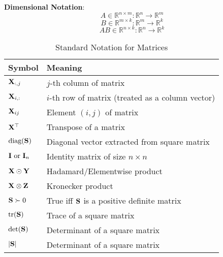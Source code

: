 \textbf{Dimensional Notation}:
\begin{equation}
    A \in \mathbb{R}^{n \times m} : \mathbb{R}^n \to \mathbb{R}^m
\end{equation}
\begin{equation}
    B \in \mathbb{R}^{m \times k} : \mathbb{R}^m \to \mathbb{R}^k
\end{equation}
\begin{equation}
    AB \in \mathbb{R}^{n \times k} : \mathbb{R}^n \to \mathbb{R}^k
\end{equation}






\begin{table}[h!]
    \centering
    \begin{tabularx}{\textwidth}{@{}p{} X@{}}
        \toprule
        \textbf{Symbol}               & \textbf{Meaning}                                  \\ \midrule
        $\mathbf{X}_{:,j}$                & $j$-th column of matrix                           \\
        $\mathbf{X}_{i,:}$                & $i$-th row of matrix (treated as a column vector) \\
        $\mathbf{X}_{ij}$                 & Element $(i, j)$ of matrix                        \\
        $\mathbf{X}^\top$                 & Transpose of a matrix                             \\
        $\text{diag}(\mathbf{S})$         & Diagonal vector extracted from square matrix      \\
        $\mathbf{I} \text{ or } \mathbf{I}_n$ & Identity matrix of size $n \times n$              \\
        $\mathbf{X} \odot \mathbf{Y}$         & Hadamard/Elementwise product                      \\
        $\mathbf{X} \otimes \mathbf{Z}$       & Kronecker product                                 \\
        $\mathbf{S} \succ 0$              & True iff $\mathbf{S}$ is a positive definite matrix   \\
        $\text{tr}(\mathbf{S})$           & Trace of a square matrix                          \\
        $\text{det}(\mathbf{S})$          & Determinant of a square matrix                    \\
        $|\mathbf{S}|$                    & Determinant of a square matrix                    \\ \bottomrule
    \end{tabularx}
    \caption{Standard Notation for Matrices}
\end{table}

